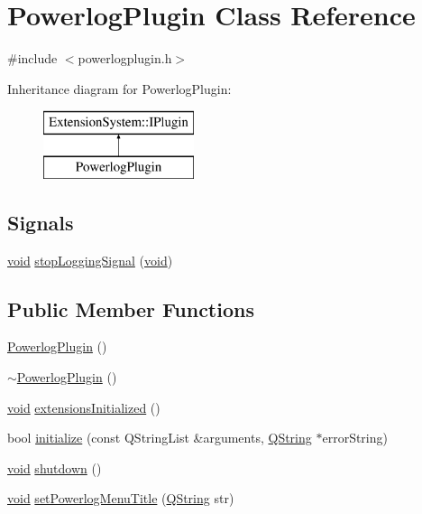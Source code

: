\hypertarget{class_powerlog_plugin}{\section{\-Powerlog\-Plugin \-Class \-Reference}
\label{class_powerlog_plugin}
}


{\ttfamily \#include $<$powerlogplugin.\-h$>$}

\-Inheritance diagram for \-Powerlog\-Plugin\-:\begin{figure}[H]
\begin{center}
\leavevmode
\includegraphics[height=2.000000cm]{class_powerlog_plugin}
\end{center}
\end{figure}
\subsection*{\-Signals}
\begin{DoxyCompactItemize}
\item 
\hyperlink{group___u_a_v_objects_plugin_ga444cf2ff3f0ecbe028adce838d373f5c}{void} \hyperlink{class_powerlog_plugin_ae0143a88ad6fd432415071ef7b0c4168}{stop\-Logging\-Signal} (\hyperlink{group___u_a_v_objects_plugin_ga444cf2ff3f0ecbe028adce838d373f5c}{void})
\end{DoxyCompactItemize}
\subsection*{\-Public \-Member \-Functions}
\begin{DoxyCompactItemize}
\item 
\hyperlink{group___power_log_ga9e38cb901b8c4d1f73f06f2b6e481e2e}{\-Powerlog\-Plugin} ()
\item 
\hyperlink{group___power_log_ga2556b7dd74c9d3c635c84f31a40269cd}{$\sim$\-Powerlog\-Plugin} ()
\item 
\hyperlink{group___u_a_v_objects_plugin_ga444cf2ff3f0ecbe028adce838d373f5c}{void} \hyperlink{group___power_log_gabdc836ec2b2a95cfe56fabe4d8c8e629}{extensions\-Initialized} ()
\item 
bool \hyperlink{group___power_log_gadc5a5af4c3942d0ec384cad6f677cef3}{initialize} (const \-Q\-String\-List \&arguments, \hyperlink{group___u_a_v_objects_plugin_gab9d252f49c333c94a72f97ce3105a32d}{\-Q\-String} $\ast$error\-String)
\item 
\hyperlink{group___u_a_v_objects_plugin_ga444cf2ff3f0ecbe028adce838d373f5c}{void} \hyperlink{group___power_log_gabcda6ddff409dc11244b3df09276d0cc}{shutdown} ()
\item 
\hyperlink{group___u_a_v_objects_plugin_ga444cf2ff3f0ecbe028adce838d373f5c}{void} \hyperlink{class_powerlog_plugin_ae881ec37fb9fd9720a404907b20adbcd}{set\-Powerlog\-Menu\-Title} (\hyperlink{group___u_a_v_objects_plugin_gab9d252f49c333c94a72f97ce3105a32d}{\-Q\-String} str)
\end{DoxyCompactItemize}



